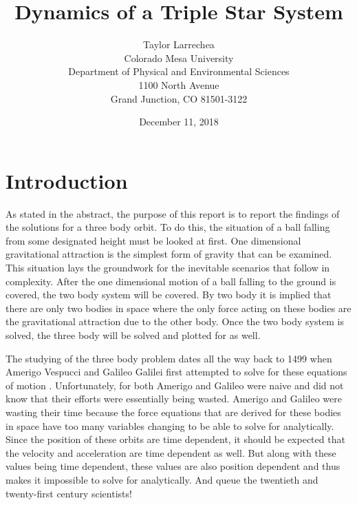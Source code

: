 \documentclass[twocolumn]{article}
\title{\textbf{Dynamics of a Triple Star System}}
\author{Taylor Larrechea \\ Colorado Mesa University \\
    Department of Physical and Environmental Sciences \\
    1100 North Avenue \\
    Grand Junction, CO 81501-3122
}
\date{December 11, 2018}
\begin{document}
\section{Introduction}
\indent As stated in the abstract, the purpose of this report is to report the findings of the solutions for a three body orbit. To do this, the situation of a ball falling from some designated height must be looked at first. One dimensional gravitational attraction is the simplest form of gravity that can be examined. This situation lays the groundwork for the inevitable scenarios that follow in complexity. After the one dimensional motion of a ball falling to the ground is covered, the two body system will be covered. By two body it is implied that there are only two bodies in space where the only force acting on these bodies are the gravitational attraction due to the other body. Once the two body system is solved, the three body will be solved and plotted for as well.

The studying of the three body problem dates all the way back to 1499 when Amerigo Vespucci and Galileo Galilei first attempted to solve for these equations of motion \cite{BodyWiki}. Unfortunately, for both Amerigo and Galileo were naive and did not know that their efforts were essentially being wasted. Amerigo and Galileo were wasting their time because the force equations that are derived for these bodies in space have too many variables changing to be able to solve for analytically. Since the position of these orbits are time dependent, it should be expected that the velocity and acceleration are time dependent as well. But along with these values being time dependent, these values are also position dependent and thus makes it impossible to solve for analytically. And queue the twentieth and twenty-first century scientists!
\end{document}
